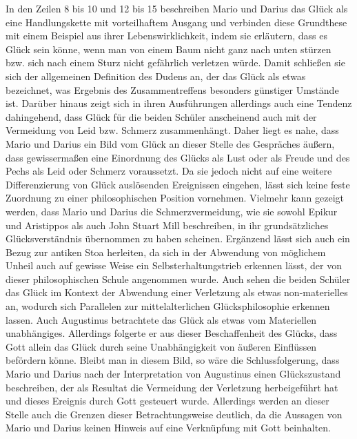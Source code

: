 In den Zeilen 8 bis 10 und 12 bis 15 beschreiben Mario und Darius das Glück als eine Handlungskette mit vorteilhaftem Ausgang und verbinden diese Grundthese mit einem Beispiel aus ihrer Lebenswirklichkeit, indem sie erläutern, dass es Glück sein könne, wenn man von einem Baum nicht ganz nach unten stürzen bzw. sich nach einem Sturz nicht gefährlich verletzen würde. 
Damit schließen sie sich der allgemeinen Definition des Dudens an, der das Glück als etwas bezeichnet, \glqq was Ergebnis des Zusammentreffens besonders günstiger Umstände ist\grqq{}\cite{D16}.
Darüber hinaus zeigt sich in ihren Ausführungen allerdings auch eine Tendenz dahingehend, dass Glück für die beiden Schüler anscheinend auch mit der Vermeidung von Leid bzw. Schmerz zusammenhängt. 
Daher liegt es nahe, dass Mario und Darius ein Bild vom Glück an dieser Stelle des Gespräches äußern, dass gewissermaßen eine Einordnung des Glücks als Lust oder als Freude und des Pechs als Leid oder Schmerz voraussetzt. 
Da sie jedoch nicht auf eine weitere Differenzierung von Glück auslösenden Ereignissen eingehen, lässt sich keine feste Zuordnung zu einer philosophischen Position vornehmen. 
Vielmehr kann gezeigt werden, dass Mario und Darius die Schmerzvermeidung, wie sie sowohl Epikur und Aristippos als auch John Stuart Mill beschreiben, in ihr grundsätzliches Glücksverständnis übernommen zu haben scheinen. 
Ergänzend lässt sich auch ein Bezug zur antiken Stoa herleiten, da sich in der Abwendung von möglichem Unheil auch auf gewisse Weise ein Selbsterhaltungstrieb erkennen lässt, der von dieser philosophischen Schule angenommen wurde. 
Auch sehen die beiden Schüler das Glück im Kontext der Abwendung einer Verletzung als etwas non-materielles an, wodurch sich Parallelen zur mittelalterlichen Glücksphilosophie erkennen lassen. 
Auch Augustinus betrachtete das Glück als etwas vom Materiellen unabhängiges. 
Allerdings folgerte er aus dieser Beschaffenheit des Glücks, dass Gott allein das Glück durch seine Unabhängigkeit von äußeren Einflüssen befördern könne. 
Bleibt man in diesem Bild, so wäre die Schlussfolgerung, dass Mario und Darius nach der Interpretation von Augustinus einen Glückszustand beschreiben, der als Resultat die Vermeidung der Verletzung herbeigeführt hat und dieses Ereignis durch Gott gesteuert wurde. 
Allerdings werden an dieser Stelle auch die Grenzen dieser Betrachtungsweise deutlich, da die Aussagen von Mario und Darius keinen Hinweis auf eine Verknüpfung mit Gott beinhalten.

